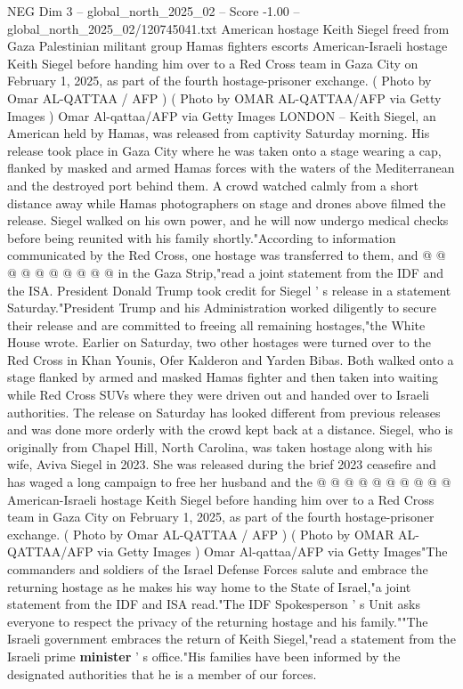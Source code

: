 \begin{textsample}{NEG Dim 3 – global\_north\_2025\_02 – Score -1.00 – global\_north\_2025\_02/120745041.txt}  \label{ex:f3_neg_166}
American hostage Keith Siegel freed from Gaza Palestinian militant group Hamas fighters escorts American-Israeli hostage Keith Siegel before handing him over to a Red Cross team in Gaza City on February 1, 2025, as part of the fourth hostage-prisoner exchange. ( Photo by Omar AL-QATTAA / AFP ) ( Photo by OMAR AL-QATTAA/AFP via Getty Images ) Omar Al-qattaa/AFP via Getty Images LONDON -- Keith Siegel, an American held by Hamas, was released from captivity Saturday morning.
His release took place in Gaza City where he was taken onto a stage wearing a cap, flanked by masked and armed Hamas forces with the waters of the Mediterranean and the destroyed port behind them.
A crowd watched calmly from a short distance away while Hamas photographers on stage and drones above filmed the release.
Siegel walked on his own power, and he will now undergo medical checks before being reunited with his family shortly."According to information communicated by the Red Cross, one hostage was transferred to them, and @ @ @ @ @ @ @ @ @ @ in the Gaza Strip,"read a joint statement from the IDF and the ISA.
President Donald Trump took credit for Siegel ' s release in a statement Saturday."President Trump and his Administration worked diligently to secure their release and are committed to freeing all remaining hostages,"the White House wrote.
Earlier on Saturday, two other hostages were turned over to the Red Cross in Khan Younis, Ofer Kalderon and Yarden Bibas.
Both walked onto a stage flanked by armed and masked Hamas fighter and then taken into waiting while Red Cross SUVs where they were driven out and handed over to Israeli authorities.
The release on Saturday has looked different from previous releases and was done more orderly with the crowd kept back at a distance.
Siegel, who is originally from Chapel Hill, North Carolina, was taken hostage along with his wife, Aviva Siegel in 2023.
She was released during the brief 2023 ceasefire and has waged a long campaign to free her husband and the @ @ @ @ @ @ @ @ @ @ American-Israeli hostage Keith Siegel before handing him over to a Red Cross team in Gaza City on February 1, 2025, as part of the fourth hostage-prisoner exchange. ( Photo by Omar AL-QATTAA / AFP ) ( Photo by OMAR AL-QATTAA/AFP via Getty Images ) Omar Al-qattaa/AFP via Getty Images"The commanders and soldiers of the Israel Defense Forces salute and embrace the returning hostage as he makes his way home to the State of Israel,"a joint statement from the IDF and ISA read."The IDF Spokesperson ' s Unit asks everyone to respect the privacy of the returning hostage and his family.""The Israeli government embraces the return of Keith Siegel,"read a statement from the Israeli prime \textbf{minister} ' s office."His families have been informed by the designated authorities that he is a member of our forces.

\end{textsample}
